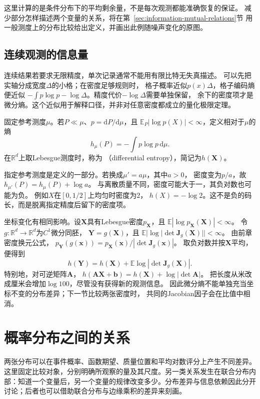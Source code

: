 这里计算的是条件分布下的平均剩余量，不是每次观测都能准确恢复的保证。
减少部分怎样描述两个变量的关系，将在第~\ref{sec:information-mutual-relations}节
用一般测度上的分布比较给出定义，并画出此例随噪声变化的原图。

\subsection{连续观测的信息量}
\label{sec:information-continuous-information}

连续结果若要求无限精度，单次记录通常不能用有限比特无失真描述。
可以先把实轴分成宽度\(\Delta\)的小格；在密度足够规则时，
格子概率近似\(p(x)\Delta\)，格子编码熵便近似
\(-\int p\log p-\log\Delta\)。精度代价\(-\log\Delta\)需要单独保留，
余下的密度项才是微分熵。这个近似用于解释口径，并非对任意密度都成立的量化极限定理。

\begin{definition}[微分熵]
\label{def:information-differential-entropy}
固定参考测度\(\mu\)。若\(P\ll\mu\)、\(p=\mathrm dP/\mathrm d\mu\)，且
\(\mathbb E_P|\log p(X)|<\infty\)，定义相对于\(\mu\)的熵
\[
  h_\mu(P)=-\int p\log p\,\mathrm d\mu.
\]
在\(\mathbb R^d\)上取Lebesgue测度时，称为
（differential entropy），简记为\(h(\bm X)\)。
\end{definition}

指定参考测度是定义的一部分。若换成\(\mu'=a\mu\)，其中\(a>0\)，
密度变为\(p/a\)，故\(h_{\mu'}(P)=h_\mu(P)+\log a\)。
与离散质量不同，密度可能大于一，其负对数也可能为负。
例如\(X\)在\([0,1/2]\)上均匀时密度为\(2\)，
\(h(X)=-\log2\)。这不是负的码长，而是脱离指定精度后留下的密度项。

坐标变化有相同影响。设\(\bm X\)具有Lebesgue密度\(p_{\bm X}\)，且
\(\mathbb E|\log p_{\bm X}(\bm X)|<\infty\)。
令\(g:\mathbb R^d\to\mathbb R^d\)为\(C^1\)微分同胚，
\(\bm Y=g(\bm X)\)，且
\(\mathbb E|\log|\det\bm J_g(\bm X)||<\infty\)。
由前章密度换元公式，
\(p_{\bm Y}(g(\bm x))=p_{\bm X}(\bm x)/|\det\bm J_g(\bm x)|\)。
取负对数并按\(\bm X\)平均，便得到
\begin{equation}
  h(\bm Y)=h(\bm X)+
  \mathbb E\log|\det\bm J_g(\bm X)|.
  \label{eq:information-differential-entropy-transform}
\end{equation}
特别地，对可逆矩阵\(\bm A\)，
\(h(\bm A\bm X+\bm b)=h(\bm X)+\log|\det\bm A|\)。
把长度从米改成厘米会增加\(\log100\)，尽管没有获得新的观测信息。
因此微分熵不能单独充当坐标不变的分布差异；下一节比较两张密度时，
共同的Jacobian因子会在比值中相消。

\section{概率分布之间的关系}
\label{sec:information-distribution-relations}
\label{sec:information-comparison-identification}
两张分布可以在事件概率、函数期望、质量位置和平均对数评分上产生不同差异。这里固定比较对象，分别明确所观察的量及其尺度。另一类关系发生在联合分布内部：知道一个变量后，另一个变量的规律改变多少。分布差异与信息依赖因此分开讨论；后者也可以借助联合分布与边缘乘积的差异来刻画。

